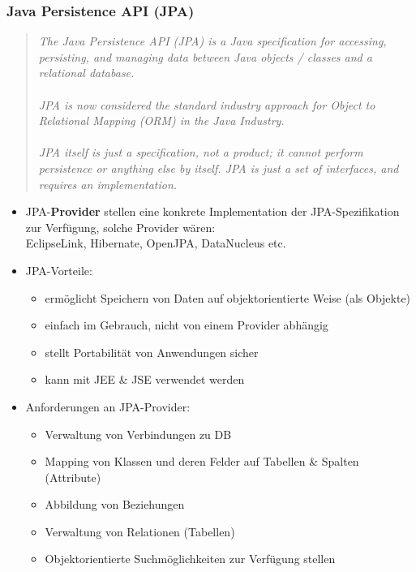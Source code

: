 \documentclass[a4paper]{article}
\begin{document}
			\subsubsection{Java Persistence API (JPA)}
			
			\begin{quote}
				\textit{The Java Persistence API (JPA) is a Java specification for accessing, persisting, and managing data between Java objects / classes and a relational database.\\
				\\
				JPA is now considered the standard industry approach for Object to Relational Mapping (ORM) in the Java Industry.\\
				\\
				JPA itself is just a specification, not a product; it cannot perform persistence or anything else by itself. JPA is just a set of interfaces, and requires an implementation.}
			\end{quote}
		
			\begin{itemize}
				\item JPA-\textbf{Provider} stellen eine konkrete Implementation der JPA-Spezifikation zur Verfügung, solche Provider wären:\\
				EclipseLink, Hibernate, OpenJPA, DataNucleus etc.
				\item JPA-Vorteile:
					\begin{itemize}
						\item ermöglicht Speichern von Daten auf objektorientierte Weise (als Objekte)
						\item einfach im Gebrauch, nicht von einem Provider abhängig
						\item stellt Portabilität von Anwendungen sicher
						\item kann mit JEE \& JSE verwendet werden
					\end{itemize}
				\item Anforderungen an JPA-Provider:
					\begin{itemize}
						\item Verwaltung von Verbindungen zu DB
						\item Mapping von Klassen und deren Felder auf Tabellen \& Spalten (Attribute)
						\item Abbildung von Beziehungen
						\item Verwaltung von Relationen (Tabellen)
						\item Objektorientierte Suchmöglichkeiten zur Verfügung stellen
					\end{itemize}
			\end{itemize}
		
\end{document}
